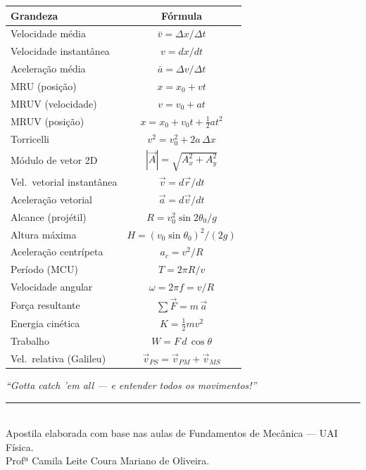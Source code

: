 \documentclass[10.5pt, a4paper]{extarticle}
\begin{document}
\begin{center}
\renewcommand{\arraystretch}{1.6}
\begin{tabular}{|l|c|}
\hline
\rowcolor{pokered} \textbf{\color{white}Grandeza} & \textbf{\color{white}Fórmula} \\
\hline
\color{pokeblue}Velocidade média          & $\bar{v} = \Delta x / \Delta t$ \\
\hline
\color{pokeblue}Velocidade instantânea    & $v = dx/dt$ \\
\hline
\color{pokeblue}Aceleração média          & $\bar{a} = \Delta v / \Delta t$ \\
\hline
\color{pokeblue}MRU (posição)             & $x = x_0 + vt$ \\
\hline
\color{pokeblue}MRUV (velocidade)         & $v = v_0 + at$ \\
\hline
\color{pokeblue}MRUV (posição)            & $x = x_0 + v_0 t + \tfrac{1}{2}at^2$ \\
\hline
\color{pokeblue}Torricelli                & $v^2 = v_0^2 + 2a\,\Delta x$ \\
\hline
\color{pokeblue}Módulo de vetor 2D        & $|\vec{A}| = \sqrt{A_x^2+A_y^2}$ \\
\hline
\color{pokeblue}Vel.\ vetorial instantânea& $\vec{v} = d\vec{r}/dt$ \\
\hline
\color{pokeblue}Aceleração vetorial       & $\vec{a} = d\vec{v}/dt$ \\
\hline
\color{pokeblue}Alcance (projétil)        & $R = v_0^2 \sin 2\theta_0 / g$ \\
\hline
\color{pokeblue}Altura máxima             & $H = (v_0\sin\theta_0)^2 / (2g)$ \\
\hline
\color{pokeblue}Aceleração centrípeta     & $a_c = v^2/R$ \\
\hline
\color{pokeblue}Período (MCU)             & $T = 2\pi R / v$ \\
\hline
\color{pokeblue}Velocidade angular        & $\omega = 2\pi f = v/R$ \\
\hline
\color{pokeblue}Força resultante          & $\sum\vec{F} = m\,\vec{a}$ \\
\hline
\color{pokeblue}Energia cinética          & $K = \tfrac{1}{2}mv^2$ \\
\hline
\color{pokeblue}Trabalho                  & $W = F\,d\,\cos\theta$ \\
\hline
\color{pokeblue}Vel.\ relativa (Galileu)  & $\vec{v}_{PS} = \vec{v}_{PM} + \vec{v}_{MS}$ \\
\hline
\end{tabular}
\end{center}

\vfill
\begin{center}
\textit{``Gotta catch 'em all --- e entender todos os movimentos!''}\\[4pt]
\textcolor{pokered}{\rule{0.5\textwidth}{1pt}}\\[4pt]
\small Apostila elaborada com base nas aulas de Fundamentos de Mecânica --- UAI Física.\\
\small Profª Camila Leite Coura Mariano de Oliveira.
\end{center}
\end{document}
